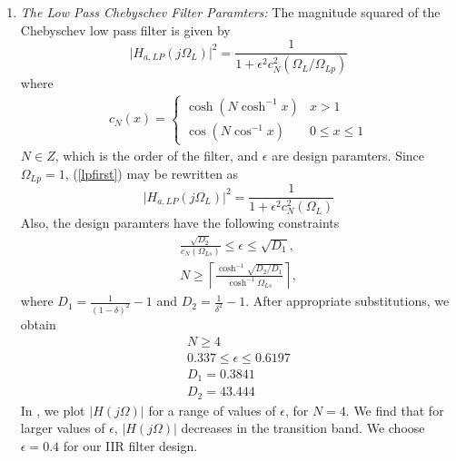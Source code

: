 \documentclass{article}
\begin{document}
\begin{enumerate}
\item {\em The Low Pass Chebyschev Filter Paramters:}  The magnitude squared of the Chebyschev low pass filter is given by 
\begin{equation}
\label{lpfirst}
\vert H_{a,LP}(j\Omega_L)\vert^2 = \frac{1}{1 + \epsilon^2c_N^2(\Omega_L/\Omega_{Lp})}
\end{equation}
where \begin{align}
c_N(x) =
    \begin{cases}
   \cosh(N \cosh^{-1}x) & x > 1 \nonumber \\
   \cos(N \cos^{-1}x) & 0 \leq x \leq 1 
    \end{cases}
\end{align}
$N\in Z$, which is the order of the filter, and $\epsilon$ are design paramters.  Since $\Omega_{Lp} = 1$, (\ref{lpfirst}) may be rewritten as
\begin{equation}
\label{lpsecond}
\vert H_{a,LP}(j\Omega_L)\vert^2 = \frac{1}{1 + \epsilon^2c_N^2(\Omega_L)}
\end{equation}
Also, the design paramters have the following constraints
\begin{eqnarray}
\label{lpdesign}
\frac{\sqrt{D_2}}{c_N(\Omega_{Ls})} \leq \epsilon \leq \sqrt{D_1}, \nonumber \\
N \geq \left\lceil \frac{\cosh^{-1}\sqrt{D_2/D_1}}{\cosh^{-1}\Omega_{Ls}} \right\rceil,
\end{eqnarray}
where $D_1 = \frac{1}{(1 - \delta)^2}-1$ and $D_2 = \frac{1}{\delta^2} - 1$.  After appropriate substitutions,
we obtain \begin{align}
    N \geq 4\\
    0.337 \leq \epsilon \leq 0.6197\\
    D_1 = 0.3841\\
    D_2 = 43.444
\end{align} 
In , we plot $\vert H(j\Omega)\vert$ for a range of values of $\epsilon$, for $N = 4$.  We find that for larger values of $\epsilon$, $|H(j\Omega)|$ decreases in the transition band.  We choose $\epsilon = 0.4$  for our IIR filter design.  



\end{enumerate}
\end{document}

